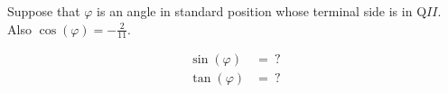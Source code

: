 Suppose that $\varphi$ is an angle in standard position whose terminal side is in Q$II$. Also $\cos(\varphi) = -\frac{2}{11}$.

$$
\begin{align*}
  \sin(\varphi) &=\ ? \\
  \tan(\varphi) &=\ ? \\
\end{align*}
$$
